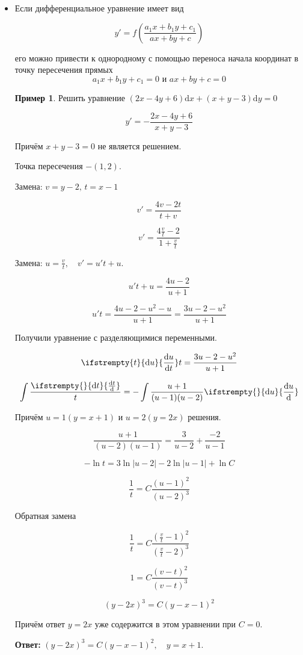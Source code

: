 \documentclass[a4paper, 14pt]{article}
\newcommand{\dx}{\mathrm{d}x}
\newcommand{\dy}{\mathrm{d}y}
\newcommand{\dv}[2]{%
  \ifstrempty{#2}%
    {\mathrm{d}#1}%
    {\frac{\mathrm{d}#1}{\mathrm{d}#2}}%
}
\theoremstyle{definition}
\newtheorem*{example}{Пример}
\newenvironment{answer}
  {\par\noindent\textbf{Ответ:}}
  {\par}
\begin{document}
\begin{itemize}
\item \textbf{}Если дифференциальное уравнение имеет вид

\[y' = f\left(\frac{a_1x+b_1y+c_1}{ax+by+c}\right)\]

его можно привести к однородному с помощью переноса начала координат в точку пересечения прямых
\[a_1x+b_1y+c_1 = 0 \text{ и } ax+by+c = 0\]

\begin{example}
    Решить уравнение $(2x-4y+6)\dx + (x+y-3)\dy = 0$

    \[y'=- \frac{2x-4y+6}{x+y-3}\]

    Причём $x+y-3 = 0$ не является решением.

    Точка пересечения $- (1, 2)$.
    
    Замена: $v = y-2, \, t = x-1$

    \[v'=\frac{4v-2t}{t+v}\]

    \[v'=\frac{4\frac{v}{t}-2}{1+\frac{v}{t}}\]

    Замена: $u = \frac{v}{t}, \quad v' = u't+u$.

    \[u't+u = \frac{4u-2}{u+1}\]

    \[u't =\frac{4u-2-u^2-u}{u+1} = \frac{3u-2-u^2}{u+1}\]

    Получили уравнение с разделяющимися переменными.

    \[\dv{u}{t}t = \frac{3u-2-u^2}{u+1}\]

    \[\int\frac{\dv{t}{}}{t} = -\int\frac{u+1}{(u-1)(u-2)}\dv{u}{}\]

    Причём $u = 1(y =x+1)$ и $u=2(y=2x)$ решения.

    \[\frac{u+1}{(u-2)(u-1)} = \frac{3}{u-2} + \frac{-2}{u-1}\]

    \[-\ln{t}= 3\ln{|u-2|} - 2\ln{|u-1|} + \ln{C} \]

    \[\frac{1}{t} = C\frac{(u-1)^2}{(u-2)^3}\]

    Обратная замена

    \[\frac{1}{t} = C\frac{(\frac{v}{t}-1)^2}{(\frac{v}{t}-2)^3}\]

    \[1 = C\frac{(v-t)^2}{(v-t)^3}\]

    \[(y-2x)^3 = C(y-x-1)^2\]

    Причём ответ $y = 2x$ уже содержится в этом уравнении при $C=0.$
    
\end{example}
\begin{answer}
    $(y-2x)^3 = C(y-x-1)^2, \quad y =x +1.$
\end{answer}



\end{itemize}
\end{document}
